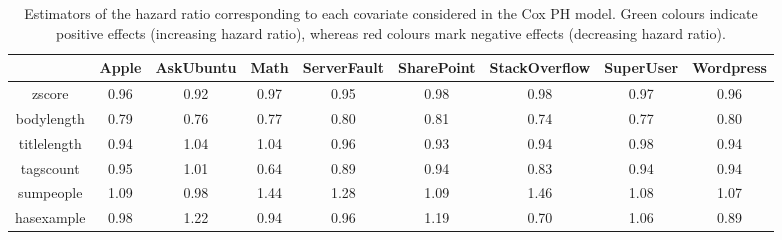\documentclass{chi2012}
\newcommand\tabhead[1]{\small\textbf{#1}}
\begin{document}
\begin{table*}
  \centering
  \begin{tabular}{|c|c|c|c|c|c|c|c|c|}
    \hline
    \tabhead{ } &
    \multicolumn{1}{|p{0.15\columnwidth}|}{\centering\tabhead{Apple}} &
    \multicolumn{1}{|p{0.2\columnwidth}|}{\centering\tabhead{AskUbuntu}} &
    \multicolumn{1}{|p{0.15\columnwidth}|}{\centering\tabhead{Math}} &
    \multicolumn{1}{|p{0.2\columnwidth}|}{\centering\tabhead{ServerFault}} &
    \multicolumn{1}{|p{0.2\columnwidth}|}{\centering\tabhead{SharePoint}} &
    \multicolumn{1}{|p{0.2\columnwidth}|}{\centering\tabhead{StackOverflow}} &
    \multicolumn{1}{|p{0.17\columnwidth}|}{\centering\tabhead{SuperUser}} &
    \multicolumn{1}{|p{0.17\columnwidth}|}{\centering\tabhead{Wordpress}}\\
    \hline
    zscore & \cellcolor[HTML]{F6CECE}0.96 & \cellcolor[HTML]{F6CECE}0.92 & 0.97 & \cellcolor[HTML]{F6CECE}0.95 & 0.98 & 0.98 & \cellcolor[HTML]{F6CECE}0.97 & \cellcolor[HTML]{F6CECE}0.96\\
    \hline
    bodylength & \cellcolor[HTML]{F78181}0.79 & \cellcolor[HTML]{F78181}0.76 & \cellcolor[HTML]{F78181}0.77 & \cellcolor[HTML]{F78181}0.80 & \cellcolor[HTML]{F78181}0.81 & \cellcolor[HTML]{F78181}0.74 & \cellcolor[HTML]{F78181}0.77 & \cellcolor[HTML]{F78181}0.80\\
    \hline
    titlelength & \cellcolor[HTML]{F6CECE}0.94 & 1.04 & 1.04 & 0.96 & \cellcolor[HTML]{F6CECE}0.93 &  \cellcolor[HTML]{F6CECE}0.94 & 0.98 & \cellcolor[HTML]{F6CECE}0.94\\
    \hline
    tagscount & 0.95 & 1.01 & \cellcolor[HTML]{F78181}0.64 & \cellcolor[HTML]{F6CECE}0.89 & \cellcolor[HTML]{F6CECE}0.94 &  \cellcolor[HTML]{F6CECE}0.83 & 0.94 & \cellcolor[HTML]{F6CECE}0.94\\
    \hline
    sumpeople & 1.09 & 0.98 & \cellcolor[HTML]{97CDAB}1.44 & \cellcolor[HTML]{CDFBDF}1.28 & 1.09 & \cellcolor[HTML]{97CDAB}1.46 & 1.08 & 1.07\\
    \hline
    hasexample & 0.98 & \cellcolor[HTML]{CDFBDF}1.22 & 0.94 & 0.96 & \cellcolor[HTML]{CDFBDF}1.19 & \cellcolor[HTML]{F78181}0.70 & 1.06 & \cellcolor[HTML]{F6CECE}0.89\\
    \hline
  \end{tabular}
  \caption{Estimators of the hazard ratio corresponding to each covariate considered
  in the Cox PH model. Green colours indicate positive effects (increasing hazard ratio),
  whereas red colours mark negative effects (decreasing hazard ratio).}
  \label{tab:hazard-ratio-estim}
\end{table*}
\end{document}
